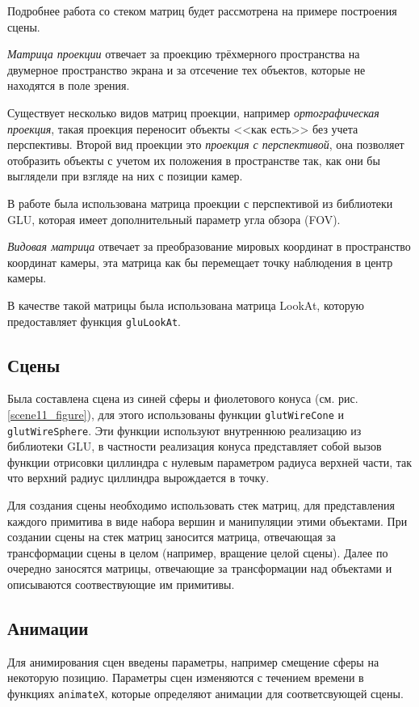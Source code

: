 \documentclass[14pt, final]{extarticle}
\begin{document}
Подробнее работа со стеком матриц будет рассмотрена на примере построения сцены.

\textit{Матрица проекции} отвечает за проекцию трёхмерного пространства на двумерное
пространство экрана и за отсечение тех объектов, которые не находятся в поле зрения.

Существует несколько видов матриц проекции, например \textit{ортографическая проекция},
такая проекция переносит объекты <<как есть>> без учета перспективы.
Второй вид проекции это \textit{проекция с перспективой}, она позволяет отобразить
объекты с учетом их положения в пространстве так, как они бы выглядели при
взгляде на них с позиции камер.

В работе была использована матрица проекции с перспективой из библиотеки GLU,
которая имеет дополнительный параметр угла обзора (FOV).

\textit{Видовая матрица} отвечает за преобразование мировых координат в пространство
координат камеры, эта матрица как бы перемещает точку наблюдения в центр
камеры.

В качестве такой матрицы была использована матрица LookAt, которую
предоставляет функция \texttt{gluLookAt}.

\subsection{Сцены}

Была составлена сцена из синей сферы и фиолетового конуса (см. рис.\,\ref{scene11_figure}),
для этого использованы функции \texttt{glutWireCone} и \texttt{glutWireSphere}.
Эти функции используют внутреннюю реализацию из библиотеки GLU, в частности
реализация конуса представляет собой вызов функции отрисовки циллиндра с
нулевым параметром радиуса верхней части, так что верхний радиус циллиндра
вырождается в точку.

Для создания сцены необходимо использовать стек матриц, для представления
каждого примитива в виде набора вершин и манипуляции этими объектами.
При создании сцены на стек матриц заносится матрица, отвечающая за
трансформации сцены в целом (например, вращение целой сцены). Далее по
очередно заносятся матрицы, отвечающие за трансформации над объектами и
описываются соотвествующие им примитивы.

\subsection{Анимации}

Для анимирования сцен введены параметры, например смещение
сферы на некоторую позицию. Параметры сцен изменяются с течением времени 
в функциях \texttt{animateX}, которые определяют анимации для соответсвующей сцены.
\end{document}

